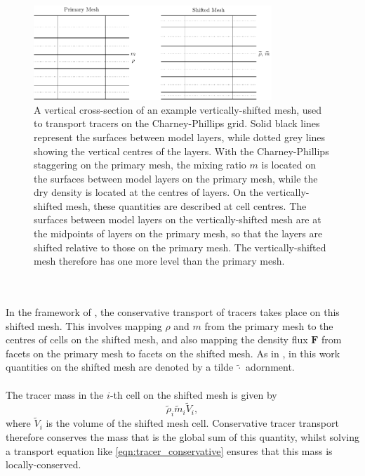 \documentclass[11pt,a4paper]{article}
\begin{document}
\begin{figure}[h!] 
\centering
\includegraphics[width=0.8\textwidth]{fig_7_shifted_mesh.pdf}
\caption{A vertical cross-section of an example vertically-shifted mesh, used to transport tracers on the Charney-Phillips grid.
Solid black lines represent the surfaces between model layers, while dotted grey lines showing the vertical centres of the layers.
With the Charney-Phillips staggering on the primary mesh, the mixing ratio $m$ is located on the surfaces between model layers on the primary mesh, while the dry density is located at the centres of layers.
On the vertically-shifted mesh, these quantities are described at cell centres.
The surfaces between model layers on the vertically-shifted mesh are at the midpoints of layers on the primary mesh, so that the layers are shifted relative to those on the primary mesh.
The vertically-shifted mesh therefore has one more level than the primary mesh.
} \label{fig:shifted}
\end{figure}
\\
\\
In the framework of \citet{bendall2023solution}, the conservative transport of tracers takes place on this shifted mesh.
This involves mapping $\rho$ and $m$ from the primary mesh to the centres of cells on the shifted mesh, and also mapping the density flux $\bm{F}$ from facets on the primary mesh to facets on the shifted mesh.
As in \citet{bendall2023solution}, in this work quantities on the shifted mesh are denoted by a tilde $\widetilde{\cdot}$ adornment. \\
\\
The tracer mass in the $i$-th cell on the shifted mesh is given by
\begin{equation}
\widetilde{\rho}_i\widetilde{m}_i \widetilde{V}_i,
\end{equation}
where $\widetilde{V}_i$ is the volume of the shifted mesh cell.
Conservative tracer transport therefore conserves the mass that is the global sum of this quantity, whilst solving a transport equation like \eqref{eqn:tracer_conservative} ensures that this mass is locally-conserved.
\end{document}

